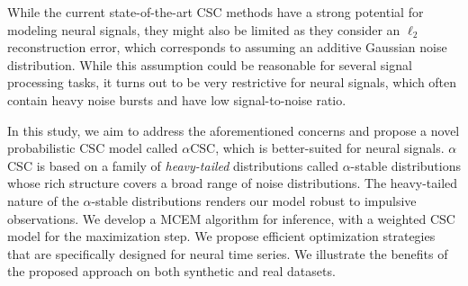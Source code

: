 

While the current state-of-the-art \ac{CSC} methods have a strong potential for modeling neural signals, they might also be limited as they consider an $\ell_2$ reconstruction error, which corresponds to assuming an additive Gaussian noise distribution. While this assumption could be reasonable for several signal processing tasks, it turns out to be very restrictive for neural signals, which often contain heavy noise bursts and have low signal-to-noise ratio.

%

In this study, we aim to address the aforementioned concerns and propose a novel probabilistic \ac{CSC} model called $\alpha$CSC, which is better-suited for neural signals. $\alpha$CSC is based on a family of \emph{heavy-tailed} distributions called $\alpha$-stable distributions \citep{samorodnitsky1994stable} whose rich structure covers a broad range of noise distributions. The heavy-tailed nature of the $\alpha$-stable distributions renders our model robust to impulsive observations. We develop a \ac{MCEM} algorithm for inference, with a weighted \ac{CSC} model for the maximization step. We propose efficient optimization strategies that are specifically designed for neural time series.
%
We illustrate the benefits of the proposed approach on both synthetic and real datasets.








